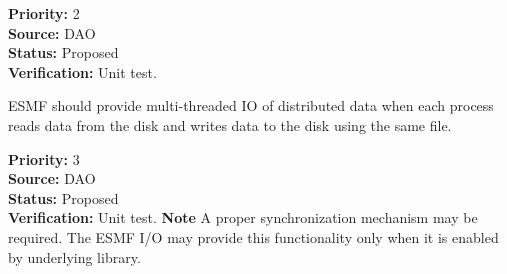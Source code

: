 \begin{reqlist}
{\bf Priority:} 2 \\
{\bf Source:} DAO \\
{\bf Status:} Proposed \\
{\bf Verification:} Unit test.
\end{reqlist}




ESMF should provide multi-threaded IO of distributed data when each
process reads data from the disk and writes data to the disk using the same 
file.  

\begin{reqlist}
{\bf Priority:} 3 \\
{\bf Source:} DAO \\
{\bf Status:} Proposed \\
{\bf Verification:} Unit test.
{\bf Note} A proper synchronization mechanism may be required. The ESMF I/O 
may provide this functionality only when it is enabled by underlying library. 
\end{reqlist}









